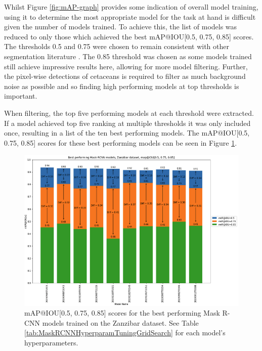 Whilst Figure \ref{fig:mAP-graph} provides some indication of overall model training, using it to determine the most appropriate model for the task at hand is difficult given the number of models trained. To achieve this, the list of models was reduced to only those which achieved the best mAP@IOU[0.5, 0.75, 0.85] scores. The thresholds 0.5 and 0.75 were chosen to remain consistent with other segmentation literature \cite{bolya_190402689_2019, wang_solov2_2020, tian_fcos_2019}. The 0.85 threshold was chosen as some models trained still achieve impressive results here, allowing for more model filtering. Further, the pixel-wise detections of cetaceans is required to filter as much background noise as possible and so finding high performing models at top thresholds is important.

When filtering, the top five performing models at each threshold were extracted. If a model  achieved top five ranking at multiple thresholds it was only included once, resulting in a list of the ten best performing models. The mAP@IOU[0.5, 0.75, 0.85] scores for these best performing models can be seen in Figure \ref{fig:mAP-best-models-bar-chart}.

\begin{figure}[h]
	\begin{center}
		\includegraphics[scale=0.55]{Chapter3/figs/mask-RCNN-model-bar-chart.png}
	\end{center}
	\caption[mAP@IOU{[0.5, 0.75, 0.85]} scores for the best performing Mask R-CNN models trained on the Zanzibar dataset.]{mAP@IOU[0.5, 0.75, 0.85] scores for the best performing Mask R-CNN models trained on the Zanzibar dataset. See Table \ref{tab:MaskRCNNHyperparamTuningGridSearch} for each model's hyperparameters.}
	\label{fig:mAP-best-models-bar-chart}
\end{figure}

